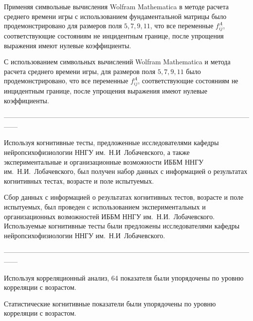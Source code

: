 Применяя символьные вычисления Wolfram Mathematica в методе расчета среднего времени игры с использованием фундаментальной матрицы было продемонстрировано для размеров поля $5, 7, 9, 11$, что все переменные $f_{ij}^A$, соответствующие состояниям не инцидентным границе, после упрощения выражения имеют нулевые коэффициенты.

С использованием символьных вычислений Wolfram Mathematica и метода расчета среднего времени игры, для размеров поля $5, 7, 9, 11$ было продемонстрировано, что все переменные $f_{ij}^A$, соответствующие состояниям не инцидентным границе, после упрощения выражения имеют нулевые коэффициенты.

------------------------------------------------------------------------------------------------------------------

Используя когнитивные тесты, предложенные исследователями кафедры нейропсихофизиологии ННГУ им.~Н.И~Лобачевского, а также экспериментальные и организационные возможности ИББМ ННГУ им.~Н.И.~Лобачевского, был получен набор данных с информацией о результатах когнитивных тестах, возрасте и поле испытуемых.

Сбор данных с информацией о результатах когнитивных тестов, возрасте и поле испытуемых, был проведен с использованием экспериментальных и организационных возможностей ИББМ ННГУ им.~Н.И.~Лобачевского. Используемые когнитивные тесты были предложены исследователями кафедры нейропсихофизиологии ННГУ им.~Н.И~Лобачевского.

------------------------------------------------------------------------------------------------------------------

Используя корреляционный анализ, 64 показателя были упорядочены по уровню корреляции с возрастом.

Статистические когнитивные показатели были упорядочены по уровню корреляции с возрастом.